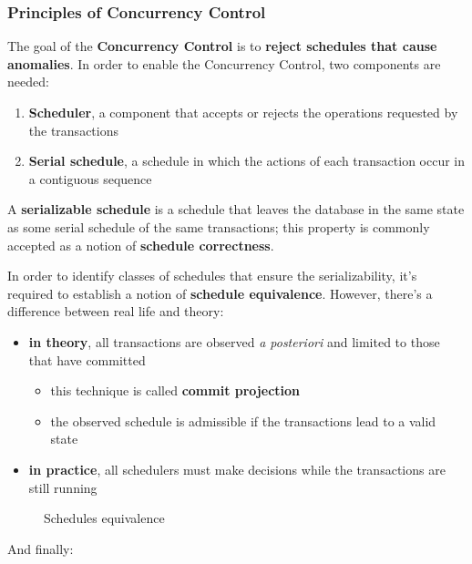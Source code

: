 \documentclass[english]{article}
\begin{document}
\subsubsection{Principles of Concurrency Control}

The goal of the \textbf{Concurrency Control} is to \textbf{reject schedules that cause anomalies}.
In order to enable the Concurrency Control, two components are needed:

\begin{enumerate}
  \item \textbf{Scheduler}, a component that accepts or rejects the operations requested by the transactions
  \item \textbf{Serial schedule}, a schedule in which the actions of each transaction occur in a contiguous sequence
\end{enumerate}

\bigskip
A \textbf{serializable schedule} is a schedule that leaves the database in the same state as some serial schedule of the same transactions;
this property is commonly accepted as a notion of \textbf{schedule correctness}.

In order to identify classes of schedules that ensure the serializability, it's required to establish a notion of \textbf{schedule equivalence}.
However, there's a difference between real life and theory:

\begin{itemize}
  \item \textbf{in theory}, all transactions are observed \textit{a posteriori} and limited to those that have committed
        \begin{itemize}
          \item this technique is called \textbf{commit projection}
          \item the observed schedule is admissible if the transactions lead to a valid state
        \end{itemize}
  \item \textbf{in practice}, all schedulers must make decisions while the transactions are still running
\end{itemize}

\begin{figure}[htbp]
  \bigskip
  \centering
  \caption{Schedules equivalence}
  \label{fig:schedules-equivalence}
  \bigskip
\end{figure}

And finally:
\end{document}
